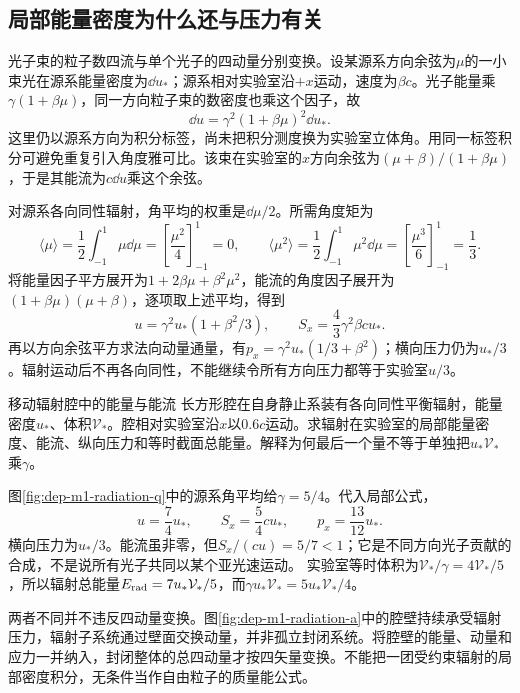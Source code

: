 \subsection{局部能量密度为什么还与压力有关}
光子束的粒子数四流与单个光子的四动量分别变换。设某源系方向余弦为$\mu$的一小束光在源系能量密度为$\dd u_*$；源系相对实验室沿$+x$运动，速度为$\beta c$。光子能量乘$\gamma(1+\beta\mu)$，同一方向粒子束的数密度也乘这个因子，故
\[
 \dd u=\gamma^2(1+\beta\mu)^2\dd u_*.
\]
这里仍以源系方向为积分标签，尚未把积分测度换为实验室立体角。用同一标签积分可避免重复引入角度雅可比。该束在实验室的$x$方向余弦为$(\mu+\beta)/(1+\beta\mu)$，于是其能流为$c\dd u$乘这个余弦。

对源系各向同性辐射，角平均的权重是$\dd\mu/2$。所需角度矩为
\[
 \langle\mu\rangle=\frac12\int_{-1}^1\mu\dd\mu
 =\left[\frac{\mu^2}{4}\right]_{-1}^1=0,
 \qquad
 \langle\mu^2\rangle=\frac12\int_{-1}^1\mu^2\dd\mu
 =\left[\frac{\mu^3}{6}\right]_{-1}^1=\frac13.
\]
将能量因子平方展开为$1+2\beta\mu+\beta^2\mu^2$，能流的角度因子展开为$(1+\beta\mu)(\mu+\beta)$，逐项取上述平均，得到
\[
 u=\gamma^2u_*(1+\beta^2/3),\qquad
 S_x=\frac43\gamma^2\beta c u_*.
\]
再以方向余弦平方求法向动量通量，有$p_x=\gamma^2u_*(1/3+\beta^2)$；横向压力仍为$u_*/3$。辐射运动后不再各向同性，不能继续令所有方向压力都等于实验室$u/3$。

\begin{example}移动辐射腔中的能量与能流
长方形腔在自身静止系装有各向同性平衡辐射，能量密度$u_*$、体积$\mathcal V_*$。腔相对实验室沿$x$以$0.6c$运动。求辐射在实验室的局部能量密度、能流、纵向压力和等时截面总能量。解释为何最后一个量不等于单独把$u_*\mathcal V_*$乘$\gamma$。
\end{example}
\begin{solution}
图\ref{fig:dep-m1-radiation-q}中的源系角平均给$\gamma=5/4$。代入局部公式，
\[
 u=\frac74u_*,\qquad S_x=\frac54cu_*,\qquad
 p_x=\frac{13}{12}u_*.
\]
横向压力为$u_*/3$。能流虽非零，但$S_x/(cu)=5/7<1$；它是不同方向光子贡献的合成，不是说所有光子共同以某个亚光速运动。
实验室等时体积为$\mathcal V_*/\gamma=4\mathcal V_*/5$，所以辐射总能量$E_{\rm rad}=7u_*\mathcal V_*/5$，而$\gamma u_*\mathcal V_*=5u_*\mathcal V_*/4$。

两者不同并不违反四动量变换。图\ref{fig:dep-m1-radiation-a}中的腔壁持续承受辐射压力，辐射子系统通过壁面交换动量，并非孤立封闭系统。将腔壁的能量、动量和应力一并纳入，封闭整体的总四动量才按四矢量变换。不能把一团受约束辐射的局部密度积分，无条件当作自由粒子的质量能公式。
\end{solution}
